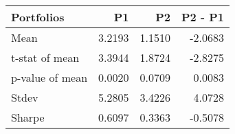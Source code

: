 \begin{tabular}{lrrr}
\toprule
Portfolios & P1 & P2 & P2 - P1 \\
\midrule
Mean & 3.2193 & 1.1510 & -2.0683 \\
t-stat of mean & 3.3944 & 1.8724 & -2.8275 \\
p-value of mean & 0.0020 & 0.0709 & 0.0083 \\
Stdev & 5.2805 & 3.4226 & 4.0728 \\
Sharpe & 0.6097 & 0.3363 & -0.5078 \\
\bottomrule
\end{tabular}
